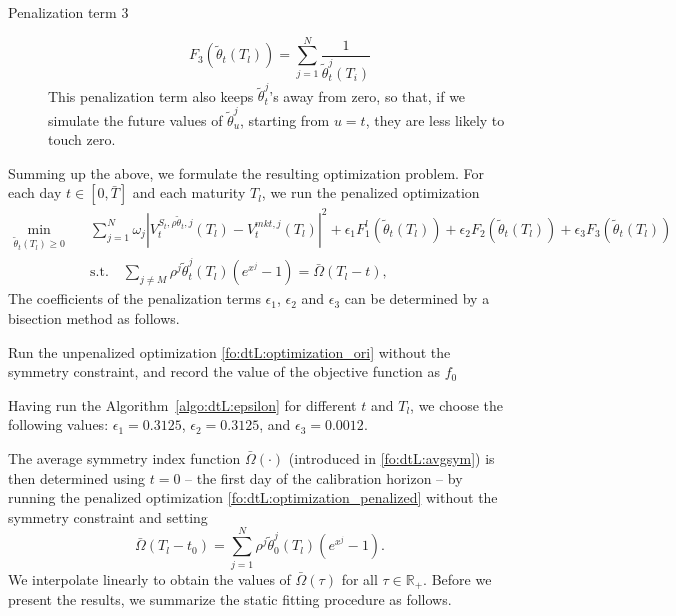 \documentclass{article}
\numberwithin{equation}{section}
\newcommand\RR {\mathbb R}
\def\bOmega{\bar{\Omega}}
\begin{document}
\begin{description}
\begin{description}
\item[Penalization term 3]
    \begin{equation} \label{fo:dtL:penalized3}
    F_3(\tilde{\theta}_t(T_l)) = \sum_{j=1}^N \frac{1}{\tilde{\theta}_t^j(T_i)}
\end{equation}
    This penalization term also keeps $\tilde{\theta}^j_t$'s away from zero, so that, if we simulate the future values of $\tilde{\theta}^j_{u}$, starting from $u=t$, they are less likely to touch zero.
\end{description}



Summing up the above, we formulate the resulting optimization problem. For each day $t\in[0,\bar{T}]$ and each maturity $T_l$, we run the penalized optimization
\begin{align}\label{fo:dtL:optimization_penalized}
\min_{\tilde{\theta}_t(T_l) \ge 0} \quad & \sum_{j=1}^N \omega_j \left|V_t^{S_t,\rho\tilde{\theta}_t,j}(T_l) - V_t^{mkt,j}(T_l)\right|^2 +  \epsilon_1 F^l_1(\tilde{\theta}_t(T_l)) + \epsilon_2 F_2(\tilde{\theta}_t(T_l)) + \epsilon_3 F_3(\tilde{\theta}_t(T_l)) \\
& \text{s.t.} \quad \sum_{j\neq M} \rho^j \tilde{\theta}_t^j(T_l) (e^{x^j} - 1) = \bOmega(T_l - t), \nonumber
\end{align}
The coefficients of the penalization terms $\epsilon_1$, $\epsilon_2$ and $\epsilon_3$ can be determined by a bisection method as follows.

\begin{algorithm}[H]
\label{algo:dtL:epsilon}
\caption{Algorithm for determining $\epsilon_1$, $\epsilon_2$ and $\epsilon_3$}
Run the unpenalized optimization \eqref{fo:dtL:optimization_ori} without the symmetry constraint, and record the value of the objective function as $f_0$\;
\end{algorithm}

Having run the Algorithm~\ref{algo:dtL:epsilon} for different $t$ and $T_l$, we choose the following values: $\epsilon_1 = 0.3125$, $\epsilon_2 = 0.3125$, and $\epsilon_3 = 0.0012$.
\end{description}
The average symmetry index function $\bOmega(\cdot)$ (introduced in \eqref{fo:dtL:avgsym}) is then determined using $t=0$ -- the first day of the calibration horizon -- by running the penalized optimization \eqref{fo:dtL:optimization_penalized} without the symmetry constraint and setting
\begin{equation}\label{fo:dtL:symmetryinit}
\bOmega(T_l - t_0) = \sum_{j=1}^N \rho^j \tilde{\theta}_{0}^j(T_l) (e^{x^j} - 1).
\end{equation}
We interpolate linearly to obtain the values of $\bOmega(\tau)$ for all $\tau \in\RR_+$.
Before we present the results, we summarize the static fitting procedure as follows.
\end{document}
